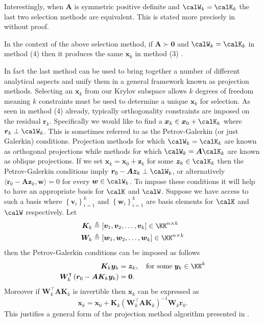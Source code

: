 Interestingly, when $\bm{A}$ is symmetric positive definite and $\calW_k = \calK_k$ the last two selection methods are equivalent. This is stated more precisely in  without proof.

\begin{thm} \label{theorem: 3_4_method_eq}
    In the context of the above selection method, if $\bm{A} \succ \bm{0}$ and $\calW_k = \calK_k$ in method (4) then it produces the same $\bm{x}_k$ in method (3) \cite{DemmelJamesW1997Anla}.
\end{thm}

In fact the last method can be used to bring together a number of different analytical aspects and unify them in a general framework known as projection methods. Selecting an $\bm{x}_k$ from our Krylov subspace allows $k$ degrees of freedom meaning $k$ constraints must be used to determine a unique $\bm{x}_k$ for selection. As seen in method (4) already, typically orthogonality constraints are imposed on the residual $\bm{r}_k$. Specifically we would like to find a $\bm{x}_k \in \bm{x}_0 + \calK_k$ where $\bm{r}_k \perp \calW_k$. This is sometimes referred to as the Petrov-Galerkin (or just Galerkin) conditions. Projection methods for which $\calW_k = \calK_k$ are known as orthogonal projections while methods for which $\calW_k = \bm{A} \calK_k$ are known as oblique projections. If we set $\bm{x}_k = \bm{x}_0 + \bm{z}_k$ for some $\bm{z}_k \in \calK_k$ then the Petrov-Galerkin conditions imply $\bm{r}_0 - \bm{A} \bm{z}_k \perp \calW_k$, or alternatively $\langle \bm{r}_0 - \bm{A} \bm{z}_k , \bm{w} \rangle = 0$ for every $\bm{w} \in \calW_k$. To impose these conditions it will help to have an appropriate basis for $\calK$ and $\calW$. Suppose we have access to such a basis where $\left\{ \bm{v}_i \right\}_{i=1}^{k}$ and $\left\{ \bm{w}_i \right\}_{i=1}^{k}$ are basis elements for $\calK$ and $\calW$ respectively. Let
\begin{align*}
    \bm{K}_k & \triangleq \left[ \bm{v}_1 , \bm{v}_2 , \ldots , \bm{v}_k \right] \in \KK^{n \times k} \\
    \bm{W}_k & \triangleq \left[ \bm{w}_1 , \bm{w}_2 , \ldots , \bm{w}_k \right] \in \KK^{n \times k}
\end{align*}
then the Petrov-Galerkin conditions can be imposed as follows
\begin{align*}
    \bm{K}_k \bm{y}_k                                                       & = \bm{z}_k , \quad \text{for some} \; \bm{y}_k \in \KK^k \\
    \bm{W}_k^{\intercal} \left( \bm{r}_0 - \bm{A} \bm{K}_k \bm{y}_k \right) & = \bm{0}.
\end{align*}
Moreover if $\bm{W}_k^{\intercal} \bm{A} \bm{K}_k$ is invertible then $\bm{x}_k$ can be expressed as
\begin{equation} \label{eq: expr_x_Petrov_Galerkin_1}
    \bm{x}_k = \bm{x}_0 + \bm{K}_k \left( \bm{W}_k^{\intercal} \bm{A} \bm{K}_k \right)^{-1} \bm{W}_k \bm{r}_0.
\end{equation}
This justifies a general form of the projection method algorithm presented in .

